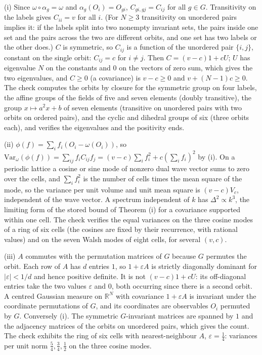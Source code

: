 (i) Since $\omega \circ \alpha_{g} = \omega$ and $\alpha_{g}(O_{i}) = O_{gi}$, $C_{gi,gj} = C_{ij}$ for all $g \in G$. Transitivity on the labels gives $C_{ii} = v$ for all $i$. (For $N \ge 3$ transitivity on unordered pairs implies it: if the labels split into two nonempty invariant sets, the pairs inside one set and the pairs across the two are different orbits, and one set has two labels or the other does.) $C$ is symmetric, so $C_{ij}$ is a function of the unordered pair $\{i, j\}$, constant on the single orbit: $C_{ij} = c$ for $i \ne j$. Then $C = (v - c)1 + cU$; $U$ has eigenvalue $N$ on the constants and $0$ on the vectors of zero sum, which gives the two eigenvalues, and $C \ge 0$ (a covariance) is $v - c \ge 0$ and $v + (N - 1)c \ge 0$. The check computes the orbits by closure for the symmetric group on four labels, the affine groups of the fields of five and seven elements (doubly transitive), the group $x \mapsto a^{2}x + b$ of seven elements (transitive on unordered pairs with two orbits on ordered pairs), and the cyclic and dihedral groups of six (three orbits each), and verifies the eigenvalues and the positivity ends.

(ii) $\phi(f) = \sum_{i}f_{i}(O_{i} - \omega(O_{i}))$, so $\mathrm{Var}_{\omega}(\phi(f)) = \sum_{ij}f_{i}C_{ij}f_{j} = (v - c)\sum_{i}f_{i}^{2} + c(\sum_{i}f_{i})^{2}$ by (i). On a periodic lattice a cosine or sine mode of nonzero dual wave vector sums to zero over the cells, and $\sum_{i}f_{i}^{2}$ is the number of cells times the mean square of the mode, so the variance per unit volume and unit mean square is $(v - c)V_{c}$, independent of the wave vector. A spectrum independent of $k$ has $\Delta^{2} \propto k^{3}$, the limiting form of the stored bound of Theorem (i) for a covariance supported within one cell. The check verifies the equal variances on the three cosine modes of a ring of six cells (the cosines are fixed by their recurrence, with rational values) and on the seven Walsh modes of eight cells, for several $(v, c)$.

(iii) $A$ commutes with the permutation matrices of $G$ because $G$ permutes the orbit. Each row of $A$ has $d$ entries $1$, so $1 + \varepsilon A$ is strictly diagonally dominant for $|\varepsilon| < 1/d$ and hence positive definite. It is not $(v - c)1 + cU$: its off-diagonal entries take the two values $\varepsilon$ and $0$, both occurring since there is a second orbit. A centred Gaussian measure on $\mathbb{R}^{N}$ with covariance $1 + \varepsilon A$ is invariant under the coordinate permutations of $G$, and its coordinates are observables $O_{i}$ permuted by $G$. Conversely (i). The symmetric $G$-invariant matrices are spanned by $1$ and the adjacency matrices of the orbits on unordered pairs, which gives the count. The check exhibits the ring of six cells with nearest-neighbour $A$, $\varepsilon = \tfrac14$: variances per unit norm $\tfrac54, \tfrac34, \tfrac12$ on the three cosine modes.


